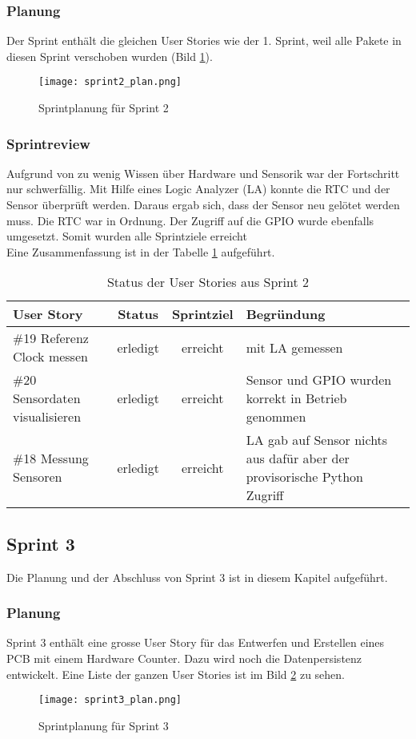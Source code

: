 \subsubsection*{Planung}
Der Sprint enthält die gleichen User Stories wie der 1. Sprint, weil alle Pakete in diesen Sprint verschoben wurden (Bild \ref{fig:sprint2}).
\begin{figure}[H]
    \centering
    \texttt{[image: sprint2\_plan.png]}
    \caption{Sprintplanung für Sprint 2}
    \label{fig:sprint2}
\end{figure}
\subsubsection*{Sprintreview}
Aufgrund von zu wenig Wissen über Hardware und Sensorik war der Fortschritt nur schwerfällig. Mit Hilfe eines Logic Analyzer (LA) konnte die RTC und der Sensor überprüft werden. Daraus ergab sich, dass der Sensor neu gelötet werden muss. Die RTC war in Ordnung. Der Zugriff auf die GPIO wurde ebenfalls umgesetzt. Somit wurden alle Sprintziele erreicht\\
Eine Zusammenfassung ist in der Tabelle \ref{tab:sprint2} aufgeführt.
\begin{table}[H]
    \centering
    \begin{tabular}{lccp{7cm}}
        \textbf{User Story} &  \textbf{Status} & \textbf{Sprintziel}& \textbf{Begründung}\\\toprule[2pt]
        \#19 Referenz Clock messen & erledigt & erreicht & mit LA gemessen\\
        \#20 Sensordaten visualisieren & erledigt & erreicht & Sensor und GPIO wurden korrekt in Betrieb genommen\\
        \#18 Messung Sensoren & erledigt & erreicht & LA gab auf Sensor nichts aus dafür aber der provisorische Python Zugriff\\
    \end{tabular}
    \caption{Status der User Stories aus Sprint 2}
    \label{tab:sprint2}
\end{table}

\clearpage
\subsection*{Sprint 3}
Die Planung und der Abschluss von Sprint 3 ist in diesem Kapitel aufgeführt.
\subsubsection*{Planung}
Sprint 3 enthält eine grosse User Story für das Entwerfen und Erstellen eines PCB mit einem Hardware Counter. Dazu wird noch die Datenpersistenz entwickelt. Eine Liste der ganzen User Stories ist im Bild \ref{fig:sprint3} zu sehen.
\begin{figure}[H]
    \centering
    \texttt{[image: sprint3\_plan.png]}
    \caption{Sprintplanung für Sprint 3}
    \label{fig:sprint3}
\end{figure}
